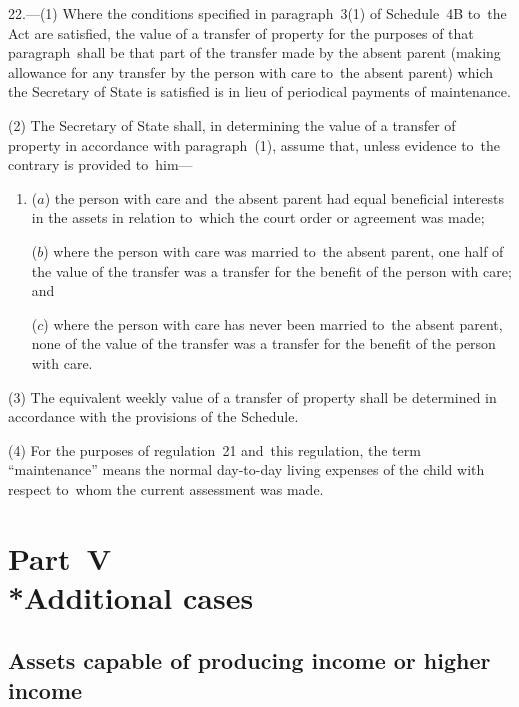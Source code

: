 \documentclass[12pt,a4paper]{article}
\begin{document}
22.—(1) Where the conditions specified in paragraph~3(1) of Schedule~4B to~the Act are satisfied, the value of a transfer of property for the purposes of that paragraph~shall be that part of the transfer made by the absent parent (making allowance for any transfer by the person with care to~the absent parent) which the Secretary of State is satisfied is in lieu of 
periodical payments of  %
maintenance.

(2) The Secretary of State shall, in determining the value of a transfer of
property in accordance with paragraph~(1), assume that, unless evidence to~the
contrary is provided to~him—
\begin{enumerate}\item[]
($a$) the person with care and~the absent parent had equal beneficial interests in
the assets in relation to~which the court order or agreement was made;

($b$) where the person with care was married to~the absent parent, one half of the
value of the transfer was a transfer for the benefit of the person with care;
and

($c$) where the person with care has never been married to~the absent parent, none
of the value of the transfer was a transfer for the benefit of the person with
care.
\end{enumerate}

(3) The equivalent weekly value of a transfer of property shall be determined in
accordance with the provisions of the Schedule.

(4) For the purposes of regulation~21 and~this regulation, the term
“maintenance” means the normal day-to-day living expenses of the child with
respect to~whom the current assessment was made.


\section[Part~V --- Additional cases]{Part~V\\*Additional cases}

\renewcommand\parthead{--- Part~V}

\subsection[23. Assets capable of producing income or higher income]{Assets capable of producing income or higher income}
\end{document}
